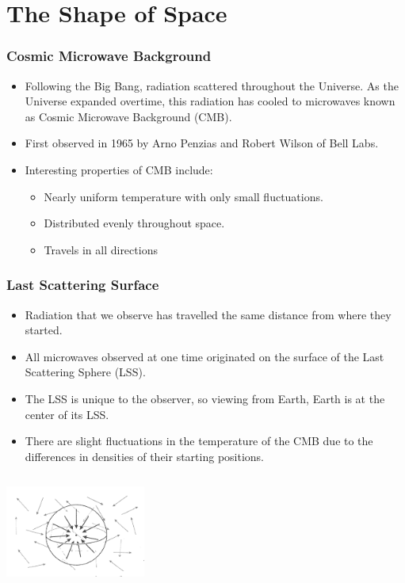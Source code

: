 \documentclass[13pt]{beamer}
\begin{document}
\section{The Shape of Space} %
\begin{frame}
\frametitle{Cosmic Microwave Background}
  \begin{itemize}
    \item Following the Big Bang, radiation scattered throughout the Universe. As the Universe expanded overtime, this radiation has cooled to microwaves known as \alert{Cosmic Microwave Background (CMB)}.
    \item First observed in 1965 by Arno Penzias and Robert Wilson of Bell Labs.
    \item Interesting properties of CMB include:
          \begin{itemize}
            \item Nearly uniform temperature with only small fluctuations.
            \item Distributed evenly throughout space.
            \item Travels in all directions
          \end{itemize}
  \end{itemize}
\end{frame}

\begin{frame}
\frametitle{Last Scattering Surface}
  \begin{itemize}
    \item Radiation that we observe has travelled the same distance from where they started.
    \item All microwaves observed at one time originated on the surface of the \alert{Last Scattering Sphere (LSS)}.
    \item The LSS is unique to the observer, so viewing from Earth, Earth is at the center of its LSS.
    \item There are slight fluctuations in the temperature of the CMB due to the differences in densities of their starting positions.
  \end{itemize}

  \begin{columns}[c] %
     \centering
     \includegraphics[height=3cm]{./img/scattering} %
  \end{columns}
\end{frame}
\end{document}
